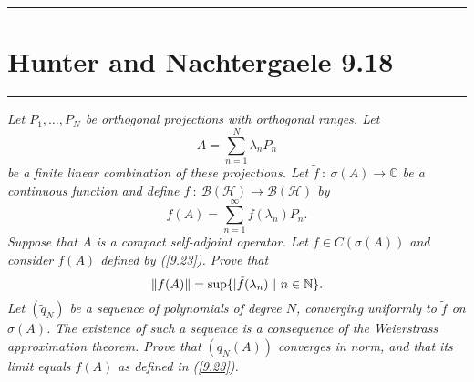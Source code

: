 \documentclass{article} %
\theoremstyle{plain}
\def\Cx{\mathbb{C}}
\newcommand{\Hilb}{\mathcal{H}}
\newcommand{\problem}[1]{
\vspace{.375cm}
\begin{minipage}{\textwidth}
    \begin{center}
        \noindent\rule{5cm}{1pt}
    \end{center}
    \section{\bf #1}
    \begin{center}
        \noindent\rule{5cm}{1pt}
    \end{center}
    \vspace{0.25cm}
\end{minipage}
}
\numberwithin{equation}{section} %
\numberwithin{figure}{section} %
\numberwithin{table}{section} %
\begin{document}
\problem{Hunter and Nachtergaele 9.18}
\emph{Let $P_1, \dots, P_N$ be orthogonal projections with orthogonal ranges.  Let $$A = \sum_{n=1}^N\lambda_n P_n$$ be a finite linear combination of these projections.  Let $\tilde{f}\ :\ \sigma(A) \rightarrow \Cx$ be a continuous function and define $f\ :\ \mathcal{B}(\Hilb) \rightarrow \mathcal{B}(\Hilb)$ by}
\begin{equation}
    \tag{9.23}
    f(A) = \sum_{n=1}^\infty \tilde{f}(\lambda_n)P_n.
    \label{9.23}
\end{equation}
\emph{Suppose that $A$ is a compact self-adjoint operator.  Let $f \in C(\sigma(A))$ and consider $f(A)$ defined by (\ref{9.23}).  Prove that $$\norm{f(A)} = \sup\{|\tilde{f}(\lambda_n)\ |\ n \in \mathbb{N}\}.$$  Let $(\tilde{q}_N)$ be a sequence of polynomials of degree $N$, converging uniformly to $\tilde{f}$ on $\sigma(A)$.  The existence of such a sequence is a consequence of the Weierstrass approximation theorem.  Prove that $(q_N(A))$ converges in norm, and that its limit equals $f(A)$ as defined in (\ref{9.23}).}
\end{document}
